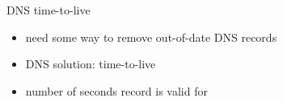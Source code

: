 \begin{frame}{DNS time-to-live}
    \begin{itemize}
    \item need some way to remove out-of-date DNS records
    \vspace{.5cm}
    \item DNS solution: time-to-live
    \item number of seconds record is valid for
    \end{itemize}
\end{frame}


